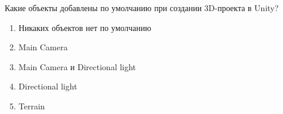 
Какие объекты добавлены по умолчанию при создании 3D-проекта в Unity?

\begin{enumerate}
    \item Никаких объектов нет по умолчанию
    \item Main Camera
    \item Main Camera и Directional light
    \item Directional light
    \item Terrain
\end{enumerate}